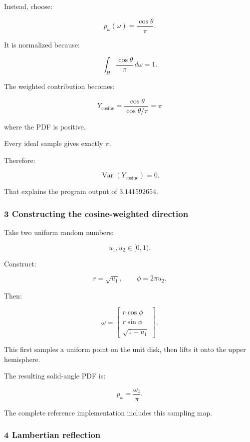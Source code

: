 \hypertarget{02-foundations-ii-ch031-cosine-weighted-hemisphere-sampling}{}

Instead, choose:

\[
 \boxed{ p_\omega(\omega)=\frac{\cos\theta}{\pi} }.
\]

It is normalized because:

\[
 \int_H\frac{\cos\theta}{\pi}\,d\omega=1.
\]

The weighted contribution becomes:

\[
 Y_{\mathrm{cosine}} = \frac{\cos\theta}{\cos\theta/\pi} =\boxed{\pi}
\]

where the PDF is positive.

Every ideal sample gives exactly \(\pi\).

Therefore:

\[
 \boxed{ \operatorname{Var}(Y_{\mathrm{cosine}})=0 }.
\]

That explains the program output of \(3.141592654\).

\subsubsection{3 Constructing the cosine-weighted direction}\label{02-foundations-ii-ch031-constructing-the-cosine-weighted-direction}

\hypertarget{02-foundations-ii-ch031-constructing-the-cosine-weighted-direction}{}

Take two uniform random numbers:

\[
 u_1,u_2\in[0,1).
\]

Construct:

\[
 r=\sqrt{u_1}, \qquad \phi=2\pi u_2.
\]

Then:

\[
 \boxed{ \omega= \begin{bmatrix} r\cos\phi\\ r\sin\phi\\ \sqrt{1-u_1} \end{bmatrix} }.
\]

This first samples a uniform point on the unit disk, then lifts it onto the upper hemisphere.

The resulting solid-angle PDF is:

\[
 \boxed{ p_\omega=\frac{\omega_z}{\pi} }.
\]

The complete reference implementation includes this sampling map.

\subsubsection{4 Lambertian reflection}\label{02-foundations-ii-ch031-lambertian-reflection}

